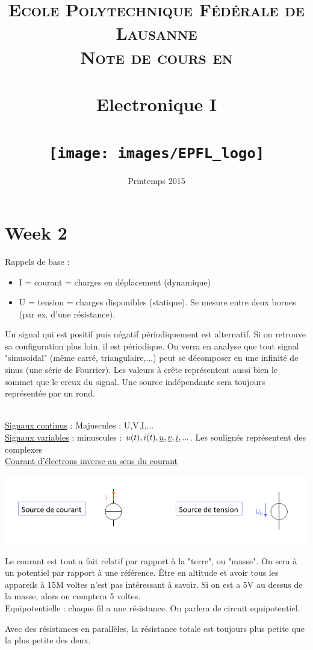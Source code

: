 \documentclass[12pt,a4paper]{article}
\date{Printemps 2015}
\title{	
\normalfont \normalsize 
\textsc{Ecole Polytechnique Fédérale de Lausanne} \\ [25pt] %
\textsc{Note de cours en }\\ [0pt] %
\horrule{0.5pt} \\[0.4cm] %
\huge Electronique I\\ %
\horrule{2pt} \\[0.5cm] %
\texttt{[image: images/EPFL\_logo]}
}
\begin{document}
\maketitle
\newpage
\tableofcontents
{}
\section{Week 2}
Rappels de base : 
\begin{itemize}
	\item I = courant = charges en déplacement (dynamique)
	\item U = tension = charges disponibles (statique). Se mesure entre deux bornes (par ex. d'une résistance).
\end{itemize}
Un signal qui est positif puis négatif périodiquement est alternatif. Si on retrouve sa configuration plus loin, il est périodique. On verra en analyse que tout signal "sinusoidal" (même carré, triangulaire,...) peut se décomposer en une infinité de sinus (une série de Fourrier). Les valeurs à crête représentent aussi bien le sommet que le creux du signal.  Une source indépendante sera toujours représentée par un rond. 
\begin{boite}
	\\
	\uline{Signaux continus} : Majuscules : U,V,I,...\\
	\uline{Signaux variables} : minuscules : $u(t), i(t), \uline{u}, \uline{v}, \uline{i},...$. Les soulignés représentent des complexes\\
	\uline{Courant d'électrons inverse au sens du courant}
	
	\includegraphics[scale=0.5]{images/conventions_dessins}
\end{boite}
Le courant est tout a fait relatif par rapport à la "terre", ou "masse". On sera à un potentiel par rapport à une référence. Être en altitude et avoir tous les appareils à 15M voltes n'est pas intéressant à savoir. Si on est a 5V au dessus de la masse, alors on comptera 5 voltes.\\
Equipotentielle : chaque fil a une résistance. On parlera de circuit equipotentiel.

Avec des résistances en parallèles, la résistance totale est toujours plus petite que la plus petite des deux.
\end{document}

